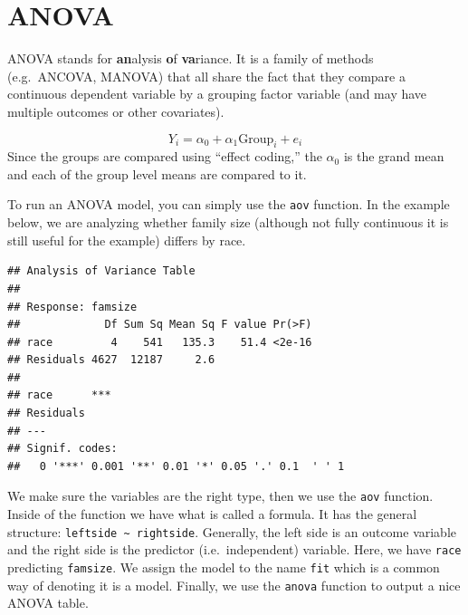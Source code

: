 \documentclass[]{tufte-book}
\newenvironment{Shaded}{}{}
\newcommand{\KeywordTok}[1]{\textcolor[rgb]{0.00,0.44,0.13}{\textbf{#1}}}
\newcommand{\DataTypeTok}[1]{\textcolor[rgb]{0.56,0.13,0.00}{#1}}
\newcommand{\StringTok}[1]{\textcolor[rgb]{0.25,0.44,0.63}{#1}}
\newcommand{\OperatorTok}[1]{\textcolor[rgb]{0.40,0.40,0.40}{#1}}
\newcommand{\NormalTok}[1]{#1}
\theoremstyle{definition}
\theoremstyle{definition}
\theoremstyle{remark}
\begin{document}
\section*{ANOVA}\label{anova}

ANOVA stands for \textbf{an}alysis \textbf{o}f \textbf{va}riance. It is
a family of methods (e.g.~ANCOVA, MANOVA) that all share the fact that
they compare a continuous dependent variable by a grouping factor
variable (and may have multiple outcomes or other covariates).

\[
Y_i = \alpha_0 + \alpha_1 \text{Group}_i + e_i
\] Since the groups are compared using ``effect coding,'' the
\(\alpha_0\) is the grand mean and each of the group level means are
compared to it.

To run an ANOVA model, you can simply use the \texttt{aov} function. In
the example below, we are analyzing whether family size (although not
fully continuous it is still useful for the example) differs by race.

\begin{Shaded}
\end{Shaded}

\begin{verbatim}
## Analysis of Variance Table
## 
## Response: famsize
##             Df Sum Sq Mean Sq F value Pr(>F)
## race         4    541   135.3    51.4 <2e-16
## Residuals 4627  12187     2.6               
##              
## race      ***
## Residuals    
## ---
## Signif. codes:  
##   0 '***' 0.001 '**' 0.01 '*' 0.05 '.' 0.1  ' ' 1
\end{verbatim}

We make sure the variables are the right type, then we use the
\texttt{aov} function. Inside of the function we have what is called a
formula. It has the general structure:
\texttt{leftside\ \textasciitilde{}\ rightside}. Generally, the left
side is an outcome variable and the right side is the predictor
(i.e.~independent) variable. Here, we have \texttt{race} predicting
\texttt{famsize}. We assign the model to the name \texttt{fit} which is
a common way of denoting it is a model. Finally, we use the
\texttt{anova} function to output a nice ANOVA table.
\end{document}
